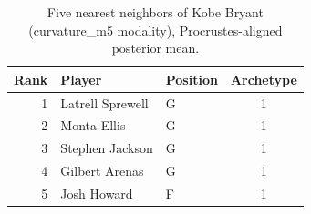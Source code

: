 \begin{table}[htbp]
  \centering\small
  \begin{tabular}{rllc}
    \toprule
    Rank & Player & Position & Archetype \\
    \midrule
    1 & Latrell Sprewell & G & 1 \\
    2 & Monta Ellis & G & 1 \\
    3 & Stephen Jackson & G & 1 \\
    4 & Gilbert Arenas & G & 1 \\
    5 & Josh Howard & F & 1 \\
    \bottomrule
  \end{tabular}
  \caption{Five nearest neighbors of Kobe Bryant (curvature_m5 modality), Procrustes-aligned posterior mean.}
  \label{tab:Kobe_Bryant_neighbors_curvature_m5}
\end{table}

